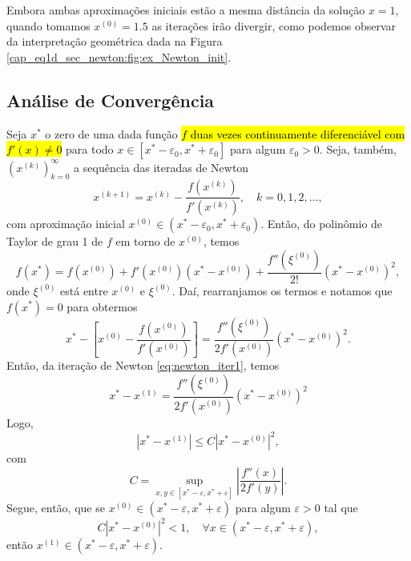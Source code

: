\begin{ex}
Embora ambas aproximações iniciais estão a mesma distância da solução $x=1$, quando tomamos $x^{(0)}=1.5$ as iterações irão divergir, como podemos observar da interpretação geométrica dada na Figura \ref{cap_eq1d_sec_newton:fig:ex_Newton_init}.
\end{ex}

\subsection{Análise de Convergência}

Seja $x^*$ o zero de uma dada função \hl{$f$ duas vezes continuamente diferenciável com $f'(x)\neq 0$} para todo $x\in [x^*-\varepsilon_0, x^*+\varepsilon_0]$ para algum $\varepsilon_0>0$. Seja, também, $(x^{(k)})_{k=0}^\infty$ a sequência das iteradas de Newton
\begin{equation}\label{eq:newton_iter1}
  x^{(k+1)} = x^{(k)} - \frac{f(x^{(k)})}{f'(x^{(k)})},\quad k=0, 1, 2, \ldots,
\end{equation}
com aproximação inicial $x^{(0)}\in (x^*-\varepsilon_0, x^*+\varepsilon_0)$. Então, do polinômio de Taylor de grau 1 de $f$ em torno de $x^{(0)}$, temos
\begin{equation}
  f(x^*) = f(x^{(0)}) + f'(x^{(0)})(x^* - x^{(0)}) + \frac{f''(\xi^{(0)})}{2!}(x^*-x^{(0)})^2,
\end{equation}
onde $\xi^{(0)}$ está entre $x^{(0)}$ e $\xi^{(0)}$. Daí, rearranjamos os termos e notamos que $f(x^*)=0$ para obtermos
\begin{equation}
  x^* - \left[x^{(0)} - \frac{f(x^{(0)})}{f'(x^{(0)})}\right] = \frac{f''(\xi^{(0)})}{2f'(x^{(0)})}(x^*-x^{(0)})^2.
\end{equation}
Então, da iteração de Newton \eqref{eq:newton_iter1}, temos
\begin{equation}
  x^* - x^{(1)} = \frac{f''(\xi^{(0)})}{2f'(x^{(0)})}(x^* - x^{(0)})^2
\end{equation}
Logo,
\begin{equation}\label{eq:newton_taxa_1}
  |x^* - x^{(1)}| \leq C |x^* - x^{(0)}|^2,
\end{equation}
com
\begin{equation}
  C = \sup_{x,y\in [x^*-\varepsilon, x^*+\varepsilon]} \left|\frac{f''(x)}{2f'(y)}\right|.
\end{equation}
Segue, então, que se $x^{(0)}\in (x^*-\varepsilon, x^* + \varepsilon)$ para algum $\varepsilon>0$ tal que
\begin{equation}
  C |x^* - x^{(0)}|^2 < 1,\quad\forall x\in (x^*-\varepsilon, x^* + \varepsilon),
\end{equation}
então $x^{(1)}\in (x^*-\varepsilon, x^*+\varepsilon)$.

